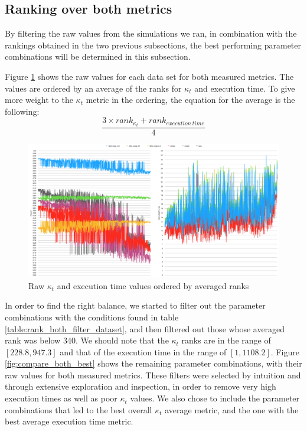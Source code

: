 \subsection{Ranking over both metrics}

By filtering the raw values from the simulations we ran, in combination with the rankings obtained in the two previous subsections, the best performing parameter combinations will be determined in this subsection.

Figure \ref{fig:rank_both_all} shows the raw values for each data set for both measured metrics. The values are ordered by an average of the ranks for $\kappa_t$ and execution time. To give more weight to the $\kappa_t$ metric in the ordering, the equation for the average is the following: 
\begin{equation}
\label{eq:rank_both}
\frac{3\times rank_{\kappa_t}+rank_{execution\ time}}{4}
\end{equation}

\begin{figure}
  \includegraphics[width=\linewidth]{./images/chapter5/rank_both}
\caption{\label{fig:rank_both_all}Raw $\kappa_t$ and execution time values ordered by averaged ranks}
\end{figure}

In order to find the right balance, we started to filter out the parameter combinations with the conditions found in table \ref{table:rank_both_filter_dataset}, and then filtered out those whose averaged rank was below 340. We should note that the $\kappa_t$ ranks are in the range of $[228.8, 947.3]$ and that of the execution time in the range of $[1, 1108.2]$. Figure \ref{fig:compare_both_best} shows the remaining parameter combinations, with their raw values for both measured metrics. These filters were selected by intuition and through extensive exploration and inspection, in order to remove very high execution times as well as poor $\kappa_t$ values. We also chose to include the parameter combinations that led to the best overall $\kappa_t$ average metric, and the one with the best average execution time metric.

